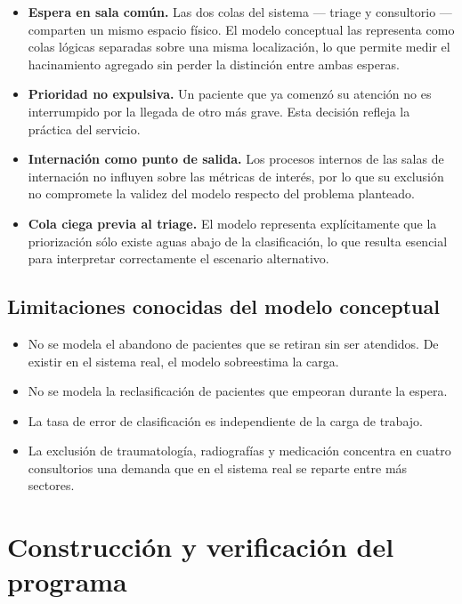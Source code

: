 \documentclass{article}
\begin{document}
\begin{itemize}
  \item \textbf{Espera en sala común.} Las dos colas del sistema --- triage y
  consultorio --- comparten un mismo espacio físico. El modelo conceptual las
  representa como colas lógicas separadas sobre una misma localización, lo
  que permite medir el hacinamiento agregado sin perder la distinción entre
  ambas esperas.
  \item \textbf{Prioridad no expulsiva.} Un paciente que ya comenzó su
  atención no es interrumpido por la llegada de otro más grave. Esta decisión
  refleja la práctica del servicio.
  \item \textbf{Internación como punto de salida.} Los procesos internos de
  las salas de internación no influyen sobre las métricas de interés, por lo
  que su exclusión no compromete la validez del modelo respecto del problema
  planteado.
  \item \textbf{Cola ciega previa al triage.} El modelo representa
  explícitamente que la priorización sólo existe aguas abajo de la
  clasificación, lo que resulta esencial para interpretar correctamente el
  escenario alternativo.
\end{itemize}

\subsection{Limitaciones conocidas del modelo conceptual}

\begin{itemize}
  \item No se modela el abandono de pacientes que se retiran sin ser
  atendidos. De existir en el sistema real, el modelo sobreestima la carga.
  \item No se modela la reclasificación de pacientes que empeoran durante la
  espera.
  \item La tasa de error de clasificación es independiente de la carga de
  trabajo.
  \item La exclusión de traumatología, radiografías y medicación concentra en
  cuatro consultorios una demanda que en el sistema real se reparte entre más
  sectores.
\end{itemize}

\section{Construcción y verificación del programa}
\end{document}
